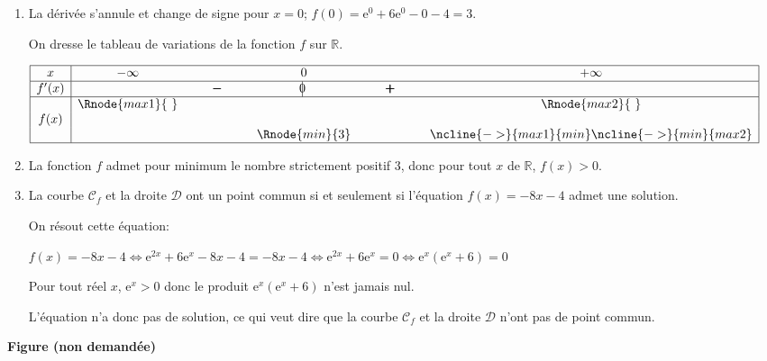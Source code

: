 \documentclass[10pt]{article}
\providecommand{\R}{\mathbb{R}}
\providecommand{\e}{{\mathrm{e}}}
\begin{document}
\begin{enumerate}
\item La dérivée s'annule et change de signe pour $x=0$; $f(0) = \e^{0} + 6\e^{0} -0 -4 = 3$.

On dresse le tableau de variations de la fonction $f$ sur $\R$.

\begin{center}
{\renewcommand{\arraystretch}{1.3}
\def\esp{\hspace*{1.5cm}}
\def\hauteur{0pt}
$\begin{array}{|c| *4{c} c|}
\hline
 x & -\infty & \esp & 0 & \esp & +\infty \\
 \hline
f'(x) &  &  \pmb{-} & \vline\hspace{-2.7pt}0 & \pmb{+} & \\  
\hline
  & \Rnode{max1}{~}  &  &  &  & \Rnode{max2}{~}   \\
f(x) & &  & & &  \rule{0pt}{\hauteur} \\
 &  & &   \Rnode{min}{3} & & \rule{0pt}{\hauteur}
\ncline{->}{max1}{min} \ncline{->}{min}{max2}\\
\hline
\end{array}$
}
\end{center}

\item 
La fonction $f$ admet pour minimum le nombre strictement positif 3, donc pour tout $x$ de $\R$, $f(x)>0$.

\item La courbe $\mathcal{C}_f$ et la droite $\mathcal{D}$ ont un point commun si et seulement si l'équation $f(x)=-8x-4$ admet une solution.

On résout cette équation:

$f(x)=-8x-4
\iff
\e^{2x} + 6 \e^{x} - 8x-4 = -8x-4
\iff
\e^{2x} + 6 \e^{x} = 0
\iff
\e^{x} \left (\e^{x}+6\right ) = 0$

Pour tout réel $x$, $\e^{x}>0$ donc le produit $\e^{x} \left (\e^{x}+6\right )$ n'est jamais nul.

L'équation n'a donc pas de solution, ce qui veut dire que la courbe $\mathcal{C}_f$ et la droite $\mathcal{D}$ n'ont pas de point commun.



\end{enumerate}


\begin{center}
\large \textbf{Figure (non demandée)}
\end{center}

\bigskip
\end{document}
